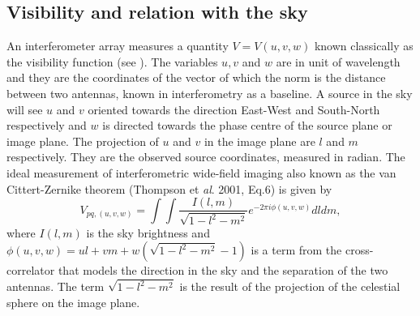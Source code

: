 \documentclass[useAMS,usenatbib]{mn2e}
\begin{document}
\subsection{Visibility and relation with the sky }
\label{sec:visSky}
An interferometer array measures a quantity $V=V(u,v,w)$ known classically as the visibility function (see \cite{5}).
The variables $u,v$ and $w$ are in unit of wavelength and they are the coordinates of the vector of which the norm is the distance between 
two antennas, known in interferometry as a baseline. A source in the sky will see $u$ and $v$ oriented towards the direction East-West and 
South-North respectively and $w$ is directed towards the phase centre of the source plane or image plane. The projection of $u$ and $v$ in 
the image plane are $l$ and $m$ respectively. They are the observed source coordinates, measured in radian. The ideal measurement of 
interferometric wide-field imaging also known as the van Cittert-Zernike theorem (Thompson et \textit{al}. 2001, Eq.6) is given by
\begin{equation}
 V_{pq,(u,v,w)}=\int \int \frac{I(l,m)}{\sqrt{1-l^2 - m^2}}e^{-2\pi i \phi (u,v,w)}dldm, \label{eq1:visSky}
\end{equation} 
where $I(l,m)$ is the sky brightness and $\phi(u,v,w)=ul+vm+w(\sqrt{1-l^2 - m^2}-1)$ is a term from the cross-correlator that models the 
direction in the sky and the separation of the two antennas. The term $\sqrt{1-l^2 - m^2}$ is the result of the projection of the celestial 
sphere on the image plane.
% 
\end{document}

